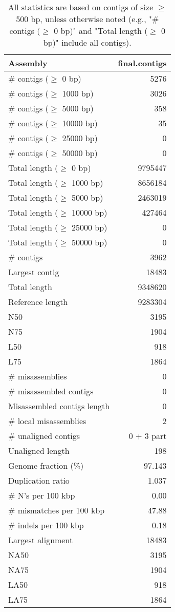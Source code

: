 \documentclass[12pt,a4paper]{article}
\begin{document}
\begin{table}[ht]
\begin{center}
\caption{All statistics are based on contigs of size $\geq$ 500 bp, unless otherwise noted (e.g., "\# contigs ($\geq$ 0 bp)" and "Total length ($\geq$ 0 bp)" include all contigs).}
\begin{tabular}{|l*{1}{|r}|}
\hline
Assembly & final.contigs \\ \hline
\# contigs ($\geq$ 0 bp) & 5276 \\ \hline
\# contigs ($\geq$ 1000 bp) & 3026 \\ \hline
\# contigs ($\geq$ 5000 bp) & 358 \\ \hline
\# contigs ($\geq$ 10000 bp) & 35 \\ \hline
\# contigs ($\geq$ 25000 bp) & 0 \\ \hline
\# contigs ($\geq$ 50000 bp) & 0 \\ \hline
Total length ($\geq$ 0 bp) & 9795447 \\ \hline
Total length ($\geq$ 1000 bp) & 8656184 \\ \hline
Total length ($\geq$ 5000 bp) & 2463019 \\ \hline
Total length ($\geq$ 10000 bp) & 427464 \\ \hline
Total length ($\geq$ 25000 bp) & 0 \\ \hline
Total length ($\geq$ 50000 bp) & 0 \\ \hline
\# contigs & 3962 \\ \hline
Largest contig & 18483 \\ \hline
Total length & 9348620 \\ \hline
Reference length & 9283304 \\ \hline
N50 & 3195 \\ \hline
N75 & 1904 \\ \hline
L50 & 918 \\ \hline
L75 & 1864 \\ \hline
\# misassemblies & 0 \\ \hline
\# misassembled contigs & 0 \\ \hline
Misassembled contigs length & 0 \\ \hline
\# local misassemblies & 2 \\ \hline
\# unaligned contigs & 0 + 3 part \\ \hline
Unaligned length & 198 \\ \hline
Genome fraction (\%) & 97.143 \\ \hline
Duplication ratio & 1.037 \\ \hline
\# N's per 100 kbp & 0.00 \\ \hline
\# mismatches per 100 kbp & 47.88 \\ \hline
\# indels per 100 kbp & 0.18 \\ \hline
Largest alignment & 18483 \\ \hline
NA50 & 3195 \\ \hline
NA75 & 1904 \\ \hline
LA50 & 918 \\ \hline
LA75 & 1864 \\ \hline
\end{tabular}
\end{center}
\end{table}
\end{document}
